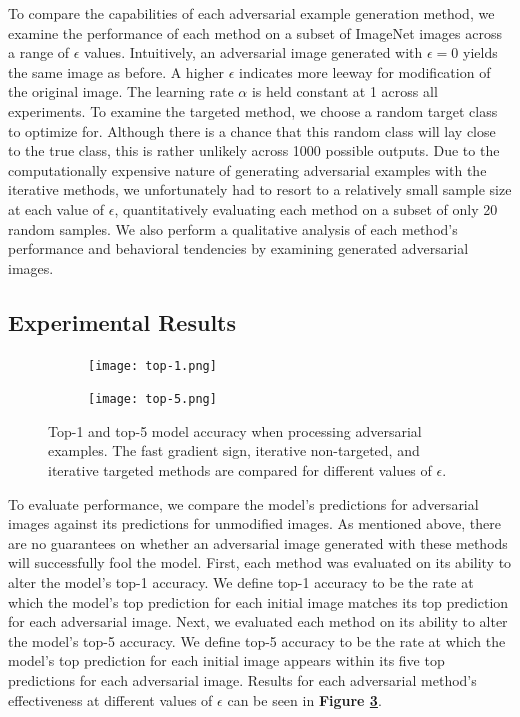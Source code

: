 \documentclass[]{article}
\begin{document}
To compare the capabilities of each adversarial example generation method, we examine the performance of each method on a subset of ImageNet images across a range of $\epsilon$ values. Intuitively, an adversarial image generated with $\epsilon=0$ yields the same image as before. A higher $\epsilon$ indicates more leeway for modification of the original image. The learning rate $\alpha$ is held constant at 1 across all experiments. To examine the targeted method, we choose a random target class to optimize for. Although there is a chance that this random class will lay close to the true class, this is rather unlikely across 1000 possible outputs. Due to the computationally expensive nature of generating adversarial examples with the iterative methods, we unfortunately had to resort to a relatively small sample size at each value of $\epsilon$, quantitatively evaluating each method on a subset of only 20 random samples. We also perform a qualitative analysis of each method's performance and behavioral tendencies by examining generated adversarial images.

\subsection{Experimental Results}

\begin{figure}
    \centering
    \begin{subfigure}{0.49\textwidth}
        \texttt{[image: top-1.png]}
        \label{fig:top1}
    \end{subfigure}
    \hfill
    \begin{subfigure}{0.49\textwidth}
        \texttt{[image: top-5.png]}
        \label{fig:top5}
    \end{subfigure}
    \caption{Top-1 and top-5 model accuracy when processing adversarial examples. The fast gradient sign, iterative non-targeted, and iterative targeted methods are compared for different values of $\epsilon$.}
    \label{fig:accuracy}
\end{figure}

To evaluate performance, we compare the model's predictions for adversarial images against its predictions for unmodified images. As mentioned above, there are no guarantees on whether an adversarial image generated with these methods will successfully fool the model. First, each method was evaluated on its ability to alter the model's top-1 accuracy. We define top-1 accuracy to be the rate at which the model's top prediction for each initial image matches its top prediction for each adversarial image. Next, we evaluated each method on its ability to alter the model's top-5 accuracy. We define top-5 accuracy to be the rate at which the model's top prediction for each initial image appears within its five top predictions for each adversarial image. Results for each adversarial method's effectiveness at different values of $\epsilon$ can be seen in \textbf{Figure \ref{fig:accuracy}}.
\end{document}
